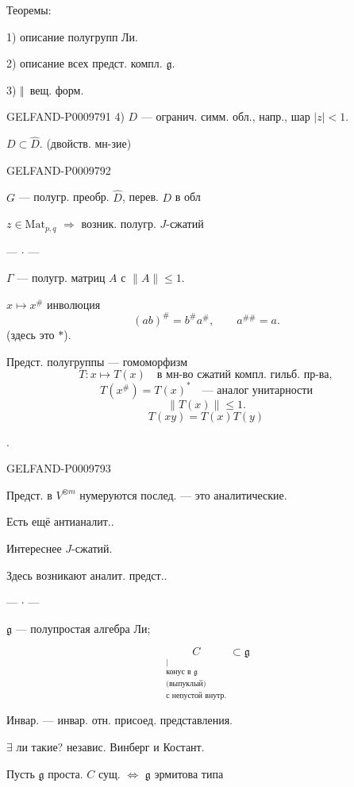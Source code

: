 Теоремы:

1) описание полугрупп Ли.

2) описание всех предст. компл. $\mathfrak g$.

3) \textemdash\(\Vert\)\textemdash\ вещ. форм.

\begin{GelfandAdjacentEvidence}{GELFAND-P000979}{1}
4) $D$ --- огранич. симм. обл., напр., шар $|z|<1$.

$D\subset\widehat D$. (двойств. мн-зие)
\end{GelfandAdjacentEvidence}
\begin{GelfandAdjacentEvidence}{GELFAND-P000979}{2}


$G$ --- полугр. преобр. $\widehat D$, перев. $D$ в обл

$z\in\mathrm{Mat}_{p,q}$ $\Rightarrow$ возник. полугр. $J$-сжатий

\begin{center}--- \(\cdot\) ---\end{center}

$\Gamma$ --- полугр. матриц $A$ с $\|A\|\leqslant1$.

$x\mapsto x^\#$ инволюция
\[
 (ab)^\#=b^\#a^\#,\qquad a^{\#\#}=a.
\]
(здесь это $*$).

Предст. полугруппы --- гомоморфизм
\[
 T\colon x\mapsto T(x)\quad\text{в мн-во сжатий компл. гильб. пр-ва},
\]
\[
 T(x^\#)=T(x)^*\quad\text{--- аналог унитарности}
\]
\[
 \|T(x)\|\leqslant1.
\]
\[
 T(xy)=T(x)T(y)
\]

.
\end{GelfandAdjacentEvidence}
\begin{GelfandAdjacentEvidence}{GELFAND-P000979}{3}


Предст. в $V^{\otimes m}$ нумеруются послед. --- это аналитические.

Есть ещё антианалит..

Интереснее $J$-сжатий.

Здесь возникают аналит. предст..

\begin{center}--- \(\cdot\) ---\end{center}

$\mathfrak g$ --- полупростая алгебра Ли;

\[
 \underset{\substack{|\\\text{конус в }\mathfrak g\\\text{(выпуклый)}\\\text{с непустой внутр.}}}{C}\subset\mathfrak g
\]

Инвар. --- инвар. отн. присоед. представления.

$\exists$ ли такие? независ. Винберг и Костант.

Пусть $\mathfrak g$ проста. $C$ сущ. $\Leftrightarrow$ $\mathfrak g$ эрмитова типа
\end{GelfandAdjacentEvidence}
